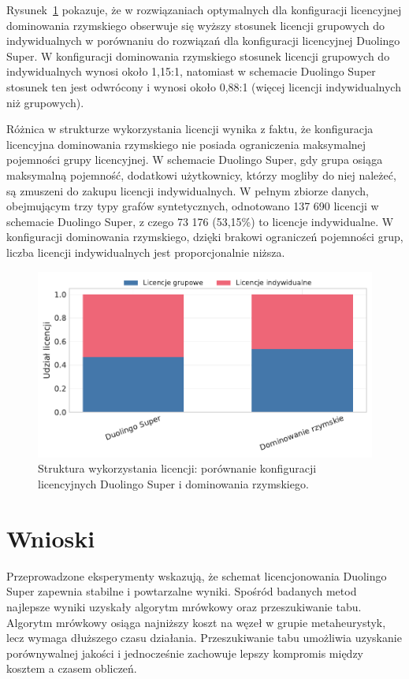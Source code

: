 Rysunek~\ref{fig:duo-roman-license} pokazuje, że w rozwiązaniach optymalnych dla konfiguracji licencyjnej dominowania rzymskiego obserwuje się wyższy stosunek licencji grupowych do indywidualnych w porównaniu do rozwiązań dla konfiguracji licencyjnej Duolingo Super. W konfiguracji dominowania rzymskiego stosunek licencji grupowych do indywidualnych wynosi około 1{,}15:1, natomiast w schemacie Duolingo Super stosunek ten jest odwrócony i wynosi około 0{,}88:1 (więcej licencji indywidualnych niż grupowych).

Różnica w strukturze wykorzystania licencji wynika z faktu, że konfiguracja licencyjna dominowania rzymskiego nie posiada ograniczenia maksymalnej pojemności grupy licencyjnej. W schemacie Duolingo Super, gdy grupa osiąga maksymalną pojemność, dodatkowi użytkownicy, którzy mogliby do niej należeć, są zmuszeni do zakupu licencji indywidualnych. W pełnym zbiorze danych, obejmującym trzy typy grafów syntetycznych, odnotowano 137 690 licencji w schemacie Duolingo Super, z czego 73 176 (53{,}15\%) to licencje indywidualne. W konfiguracji dominowania rzymskiego, dzięki brakowi ograniczeń pojemności grup, liczba licencji indywidualnych jest proporcjonalnie niższa.

\begin{figure}[H]
  \centering
  \includegraphics[width=0.6\linewidth]{assets/figures/benchmark/synthetic/license_mix_duo_vs_roman.pdf}
  \caption{Struktura wykorzystania licencji: porównanie konfiguracji licencyjnych Duolingo Super i dominowania rzymskiego.}
  \label{fig:duo-roman-license}
\end{figure}

\section{Wnioski}

Przeprowadzone eksperymenty wskazują, że schemat licencjonowania Duolingo Super zapewnia stabilne i powtarzalne wyniki. Spośród badanych metod najlepsze wyniki uzyskały algorytm mrówkowy oraz przeszukiwanie tabu. Algorytm mrówkowy osiąga najniższy koszt na węzeł w grupie metaheurystyk, lecz wymaga dłuższego czasu działania. Przeszukiwanie tabu umożliwia uzyskanie porównywalnej jakości i jednocześnie zachowuje lepszy kompromis między kosztem a czasem obliczeń.

